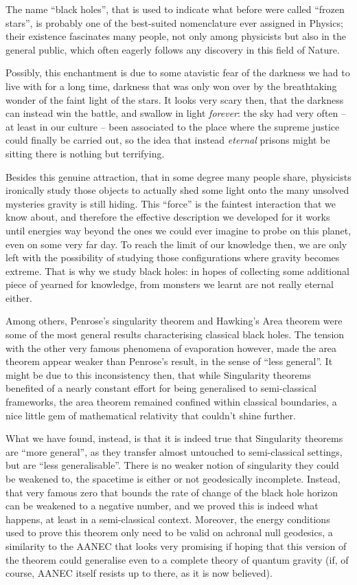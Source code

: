 The name ``black holes'', that is used to indicate what before were called ``frozen stars'', is probably one of the best-suited nomenclature ever assigned in Physics; their existence fascinates many people, not only among physicists but also in the general public, which often eagerly follows any discovery in this field of Nature.

Possibly, this enchantment is due to some atavistic fear of the darkness we had to live with for a long time, darkness that was only won over by the breathtaking wonder of the faint light of the stars. It looks very scary then, that the darkness can instead win the battle, and swallow in light \emph{forever}: the sky had very often -- at least in our culture -- been associated to the place where the supreme justice could finally be carried out, so the idea that instead \emph{eternal} prisons might be sitting there is nothing but terrifying.  
	
Besides this genuine attraction, that in some degree many people share, physicists ironically study those objects to actually shed some light onto the many unsolved mysteries gravity is still hiding.
This ``force'' is the faintest interaction that we know about, and therefore the effective description we developed for it works until energies way beyond the ones we could ever imagine to probe on this planet, even on some very far day. To reach the limit of our knowledge then, we are only left with the possibility of studying those configurations where gravity becomes extreme. That is why we study black holes: in hopes of collecting some additional piece of yearned for knowledge, from monsters we learnt are not really eternal either. 

Among others, Penrose's singularity theorem and Hawking's Area theorem were some of the most general results characterising classical black holes. The tension with the other very famous phenomena of evaporation however, made the area theorem appear weaker than Penrose's result, in the sense of ``less general''. It might be due to this inconsistency then, that while Singularity theorems benefited of a nearly constant effort for being generalised to semi-classical frameworks, the area theorem remained confined within classical boundaries, a nice little gem of mathematical relativity that couldn't shine further.

What we have found, instead, is that it is indeed true that Singularity theorems are ``more general'', as they transfer almost untouched to semi-classical settings, but are ``less generalisable''. There is no weaker notion of singularity they could be weakened to, the spacetime is either or not geodesically incomplete. Instead, that very famous zero that bounds the rate of change of the black hole horizon can be weakened to a negative number, and we proved this is indeed what happens, at least in a semi-classical context. 
Moreover, the energy conditions used to prove this theorem only need to be valid on achronal null geodesics, a similarity to the AANEC that looks very promising if hoping that this version of the theorem could generalise even to a complete theory of quantum gravity (if, of course, AANEC itself resists up to there, as it is now believed).

